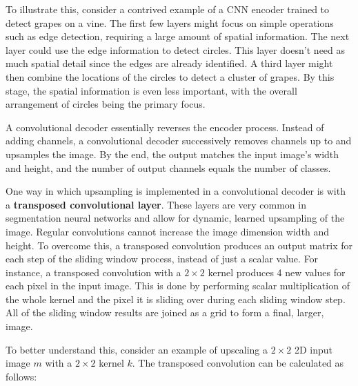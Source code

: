 To illustrate this, consider a contrived example of a CNN encoder trained to detect grapes on a vine. The first few layers might focus on simple operations such as edge detection, requiring a large amount of spatial information. The next layer could use the edge information to detect circles. This layer doesn't need as much spatial detail since the edges are already identified. A third layer might then combine the locations of the circles to detect a cluster of grapes. By this stage, the spatial information is even less important, with the overall arrangement of circles being the primary focus.

A convolutional decoder essentially reverses the encoder process. Instead of adding channels, a convolutional decoder successively removes channels up to and upsamples the image. By the end, the output matches the input image's width and height, and the number of output channels equals the number of classes.

One way in which upsampling is implemented in a convolutional decoder is with a \textbf{transposed convolutional layer}. These layers are very common in segmentation neural networks and allow for dynamic, learned upsampling of the image. Regular convolutions cannot increase the image dimension width and height. To overcome this, a transposed convolution produces an output matrix for each step of the sliding window process, instead of just a scalar value. For instance, a transposed convolution with a $2 \times 2$ kernel produces 4 new values for each pixel in the input image. This is done by performing scalar multiplication of the whole kernel and the pixel it is sliding over during each sliding window step. All of the sliding window results are joined as a grid to form a final, larger, image.

To better understand this, consider an example of upscaling a $2 \times 2$ 2D input image $m$ with a $2 \times 2$ kernel $k$. The transposed convolution can be calculated as follows:

